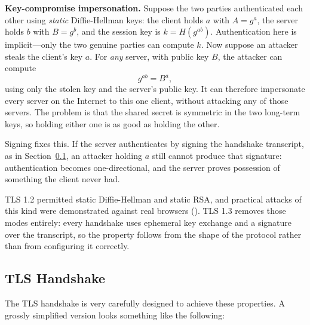 \documentclass[
  letterpaper,
]{scrbook}
\theoremstyle{definition}
\theoremstyle{plain}
\theoremstyle{plain}
\theoremstyle{remark}
\begin{document}
\textbf{Key-compromise impersonation.} Suppose the two parties
authenticated each other using \emph{static} Diffie-Hellman keys: the
client holds \(a\) with \(A = g^a\), the server holds \(b\) with
\(B = g^b\), and the session key is \(k = H(g^{ab})\). Authentication
here is implicit---only the two genuine parties can compute \(k\). Now
suppose an attacker steals the client's key \(a\). For \emph{any}
server, with public key \(B\), the attacker can compute \[
  g^{ab} = B^{a},
\] using only the stolen key and the server's public key. It can
therefore impersonate every server on the Internet to this one client,
without attacking any of those servers. The problem is that the shared
secret is symmetric in the two long-term keys, so holding either one is
as good as holding the other.

Signing fixes this. If the server authenticates by signing the handshake
transcript, as in Section~\ref{sec-tls-handshake}, an attacker holding
\(a\) still cannot produce that signature: authentication becomes
one-directional, and the server proves possession of something the
client never had.


TLS 1.2 permitted static Diffie-Hellman and static RSA, and practical
attacks of this kind were demonstrated against real browsers
(). TLS 1.3 removes those
modes entirely: every handshake uses ephemeral key exchange and a
signature over the transcript, so the property follows from the shape of
the protocol rather than from configuring it correctly.

\subsection{TLS Handshake}\label{sec-tls-handshake}

The TLS handshake is very carefully designed to achieve these
properties. A grossly simplified version looks something like the
following:
\end{document}
